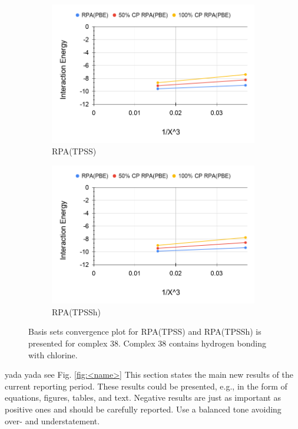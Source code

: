 \documentclass[11pt]{article}
\newcommand{\brian}[1]{{\color{orange} #1}}
\begin{document}
\begin{figure}[hbpt]
  \centering
  \begin{subfigure}{.5\textwidth}
    \centering
    \includegraphics[scale=0.3]{tpss-38.png}
    \caption{RPA(TPSS)}
    \label{fig:tpss_38}
  \end{subfigure}%
  \begin{subfigure}{.5\textwidth}
    \centering
    \includegraphics[scale=0.3]{tpssh-38.png}
    \caption{RPA(TPSSh)}
    \label{fig:tpssh_38}
  \end{subfigure}
  \caption{Basis sets convergence plot for RPA(TPSS) and RPA(TPSSh) is
    presented for complex 38. Complex 38 contains hydrogen bonding with
    chlorine.}
  \label{fig:complex_38}
\end{figure}



\brian{yada yada see Fig. \ref{fig:<name>}}
This section states the main new results of the current
reporting period. These results could be presented, e.g., in the form of
equations, figures, tables, and text. Negative results are just as
important as positive ones and should be carefully reported. Use a
balanced tone avoiding over- and understatement. 
\end{document}
